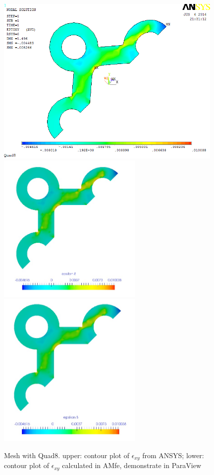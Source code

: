 \begin{figure}[htbp]
	\begin{center}
		\includegraphics[width=11cm,clip]{Quad8_Exy.png} 
		\includegraphics[width=7cm,clip]{Quad8_Exy_PD.png} 			
		\includegraphics[width=7cm,clip]{Quad8_Exy_P.png} 		
		\caption{Mesh with Quad8. upper: contour plot of $\epsilon_{xy}$ from ANSYS; lower: contour plot of $\epsilon_{xy}$ calculated in AMfe, demonstrate in ParaView} \label{fig: Quad8_Exy}
	\end{center}
\end{figure}
\clearpage 

